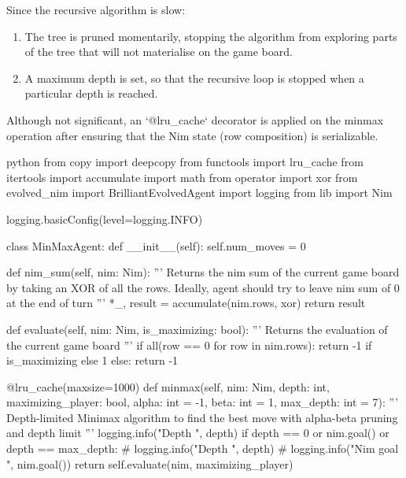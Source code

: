 Since the recursive algorithm is slow:

\begin{enumerate}
    \item The tree is pruned momentarily, stopping the algorithm from exploring parts of the tree that will not materialise on the game board.
    \item A maximum depth is set, so that the recursive loop is stopped when a particular depth is reached.
\end{enumerate}

Although not significant, an `@lru\_cache` decorator is applied on the minmax operation after ensuring that the Nim state (row composition) is serializable.

\begin{mintedbox}{python}
from copy import deepcopy
from functools import lru_cache
from itertools import accumulate
import math
from operator import xor
from evolved_nim import BrilliantEvolvedAgent
import logging
from lib import Nim

logging.basicConfig(level=logging.INFO)

class MinMaxAgent:
    def __init__(self):
        self.num_moves = 0

    def nim_sum(self, nim: Nim):
        '''
        Returns the nim sum of the current game board
        by taking an XOR of all the rows.
        Ideally, agent should try to leave nim sum of 0 at the end of turn
        '''
        *_, result = accumulate(nim.rows, xor)
        return result

    def evaluate(self, nim: Nim, is_maximizing: bool):
        '''
        Returns the evaluation of the current game board
        '''
        if all(row == 0 for row in nim.rows):
            return -1 if is_maximizing else 1
        else:
            return -1

    @lru_cache(maxsize=1000)
    def minmax(self, nim: Nim, depth: int, maximizing_player: bool, alpha: int = -1, beta: int = 1, max_depth: int = 7):
        '''
        Depth-limited Minimax algorithm to find the best move with alpha-beta pruning and depth limit
        '''
        logging.info("Depth ", depth)
        if depth == 0 or nim.goal() or depth == max_depth:
            # logging.info("Depth ", depth)
            # logging.info("Nim goal ", nim.goal())
            return self.evaluate(nim, maximizing_player)


\end{mintedbox}
